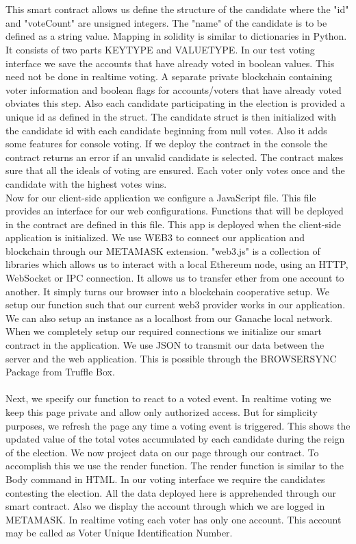 \documentclass{article}
\begin{document}
\\
\\
This smart contract allows us define the structure of the candidate where the "id" and "voteCount" are unsigned integers. The "name" of the candidate is to be defined as a string value. Mapping in solidity is similar to dictionaries in Python. It consists of two parts KEYTYPE and VALUETYPE. In our test voting interface we save the accounts that have already voted in boolean values. This need not be done in realtime voting. A separate private blockchain containing voter information and boolean flags for accounts/voters that have already voted obviates this step. Also each candidate participating in the election is provided a unique id as defined in the struct. The candidate struct is then initialized with the candidate id with each candidate beginning from null votes. Also it adds some features for console voting. If we deploy the contract in the console the contract returns an error if an unvalid candidate is selected. The contract makes sure that all the ideals of voting are ensured. Each voter only votes once and the candidate with the highest votes wins.
\\
Now for our client-side application we configure a JavaScript file. This file provides an interface for our web configurations. Functions that will be deployed in the contract are defined in this file. This app is deployed when the client-side application is initialized. We use WEB3 to connect our application and blockchain through our METAMASK extension. "web3.js" is a collection of libraries which allows us to interact with a local Ethereum node, using an HTTP, WebSocket or IPC connection. It allows us to transfer ether from one account to another. It simply turns our browser into a blockchain cooperative setup. We setup our function such that our current web3 provider works in our application. We can also setup an instance as a localhost from our Ganache local network.  When we completely setup our required connections we initialize our smart contract in the application. We use JSON to transmit our data between the server and the web application. This is possible through the BROWSERSYNC Package from Truffle Box.
\\

\\
Next, we specify our function to react to a voted event. In realtime voting we keep this page private and allow only authorized access. But for simplicity purposes, we refresh the page any time a voting event is triggered. This shows the updated value of the total votes accumulated by each candidate during the reign of the election. We now project data on our page through our contract. To accomplish this we use the render function.  The render function is similar to the Body command in HTML. In our voting interface we require the candidates contesting the election. All the data deployed here is apprehended through our smart contract. Also we display the account through which we are logged in METAMASK. In realtime voting each voter has only one account. This account may be called as Voter Unique Identification Number.
\\
\end{document}
